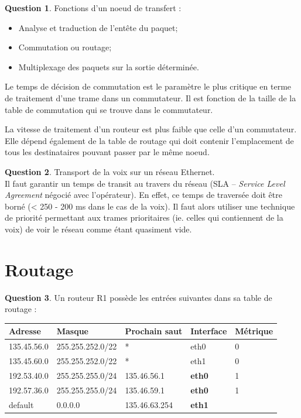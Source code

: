 \documentclass[11pt,english,french]{scrreprt}
\theoremstyle{remark}
\theoremstyle{definition}
\newtheorem{ques}{Question}[section]
\begin{document}
\begin{ques}
	Fonctions d'un noeud de transfert :\begin{itemize}
		\item Analyse et traduction de l'entête du paquet;
		\item Commutation ou routage;
		\item Multiplexage des paquets sur la sortie déterminée. 
	\end{itemize}
	
	Le temps de décision de commutation est le paramètre le plus critique en terme de traitement d'une trame dans un commutateur. Il est fonction de la taille de la table de commutation qui se trouve dans le commutateur.
	
	La vitesse de traitement d'un routeur est plus faible que celle d'un commutateur. Elle dépend également de la table de routage qui doit contenir l'emplacement de tous les destinataires pouvant passer par le même noeud.
\end{ques}

\begin{ques}
	Transport de la voix sur un réseau Ethernet.\\
	Il faut garantir un temps de transit au travers du réseau (SLA -- \emph{Service Level Agreement} négocié avec l'opérateur). En effet, ce temps de traversée doit être borné (< 250 - 200 ms dans le cas de la voix). Il faut alors utiliser une technique de priorité permettant aux trames prioritaires (ie. celles qui contiennent de la voix) de voir le réseau comme étant quasiment vide.
\end{ques}

\section{Routage} %

\begin{ques}
	Un routeur R1 possède les entrées suivantes dans sa table de routage : 
	
	\begin{tabularx}{\textwidth}{XXXll}
		\toprule 
		Adresse & Masque & Prochain saut & Interface & Métrique\tabularnewline
		\midrule
		\midrule 
		135.45.56.0 & 255.255.252.0/22 & {*} & eth0 & 0\tabularnewline
		\midrule 
		135.45.60.0 & 255.255.252.0/22 & {*} & eth1 & 0\tabularnewline
		\midrule 
		192.53.40.0 & 255.255.255.0/24 & 135.46.56.1 & \textbf{eth0} & 1\tabularnewline
		\midrule 
		192.57.36.0 & 255.255.255.0/24 & 135.46.59.1 & \textbf{eth0} & 1\tabularnewline
		\midrule 
		default & 0.0.0.0 & 135.46.63.254 & \textbf{eth1} & \tabularnewline
		\bottomrule
	\end{tabularx}
\end{ques}
\end{document}
